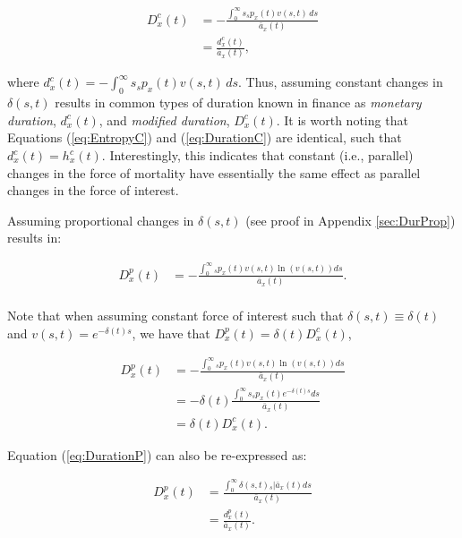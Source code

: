 \documentclass[12pt]{article}
\begin{document}
\begin{equation}\label{eq:DurationC}
	\begin{split}
		{D}^{c}_x(t) &= -\frac{\int_0^\infty s {}_s p_x(t) {v}(s,t) \, ds}{\bar{a}_x(t)} \\
		&= \frac{{d}^{c}_x(t)}{\bar{a}_x(t)},
	\end{split}
\end{equation}

where ${d}^{c}_x(t) = -\int_0^\infty s {}_s p_x(t) {v}(s,t) \, ds$. Thus, assuming constant changes in $\delta(s,t)$ results in common types of duration known in finance as \textit{monetary duration}, ${d}^{c}_x(t)$, and \textit{modified duration}, ${D}^{c}_x(t)$. It is worth noting that Equations (\ref{eq:EntropyC}) and (\ref{eq:DurationC}) are identical, such that ${d}^{c}_x(t) = {h}^{c}_{x}(t)$. Interestingly, this indicates that constant (i.e., parallel) changes in the force of mortality have essentially the same effect as parallel changes in the force of interest.

Assuming proportional changes in $\delta(s,t)$ (see proof in Appendix \ref{sec:DurProp}) results in: 


\begin{equation}\label{eq:DurationP}
\begin{split}
{D}^{p}_{x}(t) &= -\frac{\int_0^\infty {}_sp_x(t) v(s,t) \ln(v(s,t))ds}{\bar{a}_x(t)}. \\
\end{split}
\end{equation}


Note that when assuming constant force of interest such that $\delta(s,t) \equiv \delta(t)$ and $v(s,t)=e^{-\delta(t)s}$, we have that ${D}^{p}_{x}(t)=\delta(t){D}^{c}_{x}(t)$,


\begin{equation}\label{eq:DurationCP}
\begin{split}
{D}^{p}_{x}(t) &= -\frac{\int_0^\infty {}_sp_x(t) v(s,t) \ln(v(s,t))ds}  {\bar{a}_x(t)} \\
&=- \delta(t)\frac{\int_0^\infty s{}_sp_x(t) e^{-\delta(t)s}  ds}{\bar{a}_x(t)} \\
& = \delta(t){D}^{c}_{x}(t).
\end{split}
\end{equation}

Equation (\ref{eq:DurationP}) can also be re-expressed as:

\begin{equation}\label{eq:DurationP2}
\begin{split}
{D}^{p}_{x}(t) &= \frac{\int_0^\infty \delta(s,t) {}_s|\bar{a}_x(t)ds} {\bar{a}_x(t)} \\
                 &= \frac{{d}^{p}_{x}(t)}{\bar{a}_x(t)}.
\end{split}
\end{equation}
\end{document}
